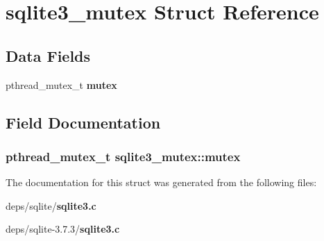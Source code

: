 \section{sqlite3\_\-mutex Struct Reference}
\label{structsqlite3__mutex}
\subsection*{Data Fields}
\begin{CompactItemize}
\item 
pthread\_\-mutex\_\-t \bf{mutex}
\end{CompactItemize}


\subsection{Field Documentation}
\subsubsection{\setlength{\rightskip}{0pt plus 5cm}pthread\_\-mutex\_\-t \bf{sqlite3\_\-mutex::mutex}}\label{structsqlite3__mutex_ee8cbdc6620feeaa6335d074bc8da86e}




The documentation for this struct was generated from the following files:\begin{CompactItemize}
\item 
deps/sqlite/\bf{sqlite3.c}\item 
deps/sqlite-3.7.3/\bf{sqlite3.c}\end{CompactItemize}
